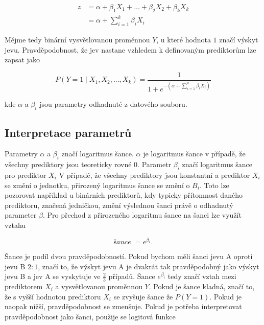 \begin{equation}
    \label{eq:linearni_kombinace_z}
    \begin{split}
        z &= \alpha + \beta_1 X_1 + ... + \beta_2 X_2 +\beta_k X_k \\
          &= \alpha + \sum_{i=1}^k \beta_i X_i
    \end{split}
\end{equation}

Mějme tedy binární vysvětlovanou proměnnou $Y$, u které hodnota $1$ značí výskyt jevu. Pravděpodobnost, že jev nastane
vzhledem k definovaným prediktorům lze zapsat jako

\begin{equation}
    \label{eq:pravdepodobnost_y}
    P(Y = 1 \mid X_1, X_2, ..., X_k) = \frac{1}{1 + e^{- \left( \alpha + \sum_{i=1}^k \beta_i X_i \right) }}
\end{equation}

kde $\alpha$ a $\beta_i$ jsou parametry odhadnuté z datového souboru. 

\subsection{Interpretace parametrů}
Parametry $\alpha$ a $\beta_i$ značí logaritmus šance. $\alpha$ je logaritmus šance v případě, že všechny prediktory
jsou teoreticky rovné $0$. Parametr $\beta_i$ značí logaritmus šance pro prediktor $X_i$
{\color{red}
V případě, že všechny prediktory jsou konstantní a prediktor $X_i$ se změní o jednotku, přirozený logaritmus
šance se změní o $B_i$. Toto lze pozorovat například u binárních prediktorů, kdy typicky přítomnost
daného prediktoru, značená jedničkou, změní výslednou šanci právě o odhadnutý parameter $\beta$.
Pro přechod z přirozeného logaritmu šance na šanci lze využít vztahu
}

\begin{equation}
\textit{šance } = e^{\beta_i}.
\end{equation}

Šance je podíl dvou pravděpodobností. Pokud bychom měli šanci jevu A oproti jevu B $2 : 1$, značí to, že výskyt jevu A je dvakrát tak pravděpodobný
jako výskyt jevu B a jev A se vyskytuje ve $\frac{2}{3}$ případů. Šance $e^{\beta_i}$ tedy značí vztah mezi prediktorem $X_i$ a vysvětlovanou proměnnou $Y$. Pokud je
šance kladná, značí to, že s vyšší hodnotou prediktoru $X_i$ se zvyšuje šance že $P(Y = 1)$. Pokud je naopak nižší, pravděpodobnost se zmenšuje. Pokud je potřeba
interpretovat pravděpodobnost jako šanci, použije se logitová funkce

